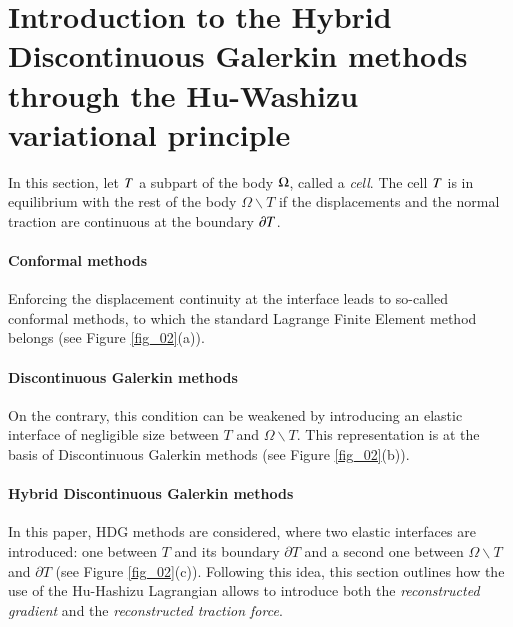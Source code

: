 \section{Introduction to the Hybrid Discontinuous Galerkin methods through the Hu-Washizu variational principle}
\label{sec_appendix_composite_demo}

In this section, let $T$ a subpart of the body \(\Omega\), called a \textit{cell}.
The cell $T$ is in
equilibrium with the rest of the body \(\Omega\backslash T\) if the
displacements and the normal traction are continuous at the boundary
$\partial T{}$.

\paragraph{Conformal methods} Enforcing the displacement continuity at the interface leads to
so-called conformal methods, to which the standard Lagrange Finite Element
method belongs (see Figure \ref{fig_02}(a)).

\paragraph{Discontinuous Galerkin methods} On
the contrary, this condition can be weakened by introducing an elastic
interface of negligible size between \(T\) and \(\Omega\backslash T\).
This representation is at the basis of Discontinuous Galerkin methods
(see Figure \ref{fig_02}(b)).

\paragraph{Hybrid Discontinuous Galerkin methods} In
this paper, HDG methods are considered,
where two elastic interfaces are introduced: one between \(T\) and its
boundary \(\partial T\) and a second one between \(\Omega\backslash T\)
and \(\partial T\) (see Figure \ref{fig_02}(c)).
Following this idea,
this section outlines how the use of the Hu-Hashizu Lagrangian allows to
introduce both the
\textit{reconstructed gradient} and the \textit{reconstructed traction force}.

